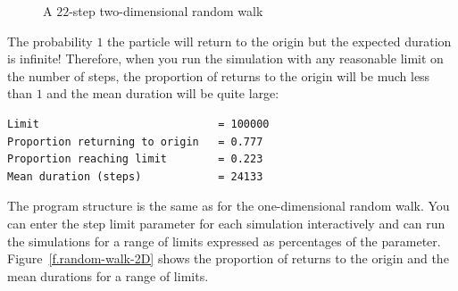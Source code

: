 \begin{figure}
\begin{center}
\end{center}
\caption{A $22$-step two-dimensional random walk}\label{f.2d-random-walk}
\end{figure}
The probability $1$ the particle will return to the origin but the expected duration is infinite! Therefore, when you run the simulation with any reasonable limit on the number of steps, the proportion of returns to the origin will be much less than $1$ and the mean duration will be quite large:
\begin{verbatim}
Limit                            = 100000
Proportion returning to origin   = 0.777
Proportion reaching limit        = 0.223
Mean duration (steps)            = 24133
\end{verbatim}

The program structure is the same as for the one-dimensional random walk. You can enter the step limit parameter for each simulation interactively and can run the simulations for a range of limits expressed as percentages of the parameter. Figure~\ref{f.random-walk-2D} shows the proportion of returns to the origin and the mean durations for a range of limits.

